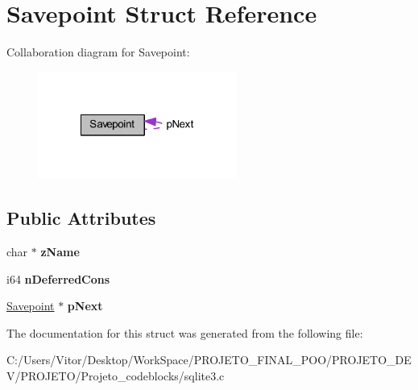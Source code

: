 \hypertarget{struct_savepoint}{\section{Savepoint Struct Reference}
\label{struct_savepoint}
}


Collaboration diagram for Savepoint\-:\nopagebreak
\begin{figure}[H]
\begin{center}
\leavevmode
\includegraphics[width=185pt]{struct_savepoint__coll__graph}
\end{center}
\end{figure}
\subsection*{Public Attributes}
\begin{DoxyCompactItemize}
\item 
\hypertarget{struct_savepoint_a0ba08ea77fcfd93099288375e2e9b1ec}{char $\ast$ {\bfseries z\-Name}}\label{struct_savepoint_a0ba08ea77fcfd93099288375e2e9b1ec}

\item 
\hypertarget{struct_savepoint_ae00dd8f725701d9e31da2edbb0b27435}{i64 {\bfseries n\-Deferred\-Cons}}\label{struct_savepoint_ae00dd8f725701d9e31da2edbb0b27435}

\item 
\hypertarget{struct_savepoint_a8d785c3c0eeb6f0c62ea5391892c78cb}{\hyperlink{struct_savepoint}{Savepoint} $\ast$ {\bfseries p\-Next}}\label{struct_savepoint_a8d785c3c0eeb6f0c62ea5391892c78cb}

\end{DoxyCompactItemize}


The documentation for this struct was generated from the following file\-:\begin{DoxyCompactItemize}
\item 
C\-:/\-Users/\-Vitor/\-Desktop/\-Work\-Space/\-P\-R\-O\-J\-E\-T\-O\-\_\-\-F\-I\-N\-A\-L\-\_\-\-P\-O\-O/\-P\-R\-O\-J\-E\-T\-O\-\_\-\-D\-E\-V/\-P\-R\-O\-J\-E\-T\-O/\-Projeto\-\_\-codeblocks/sqlite3.\-c\end{DoxyCompactItemize}

